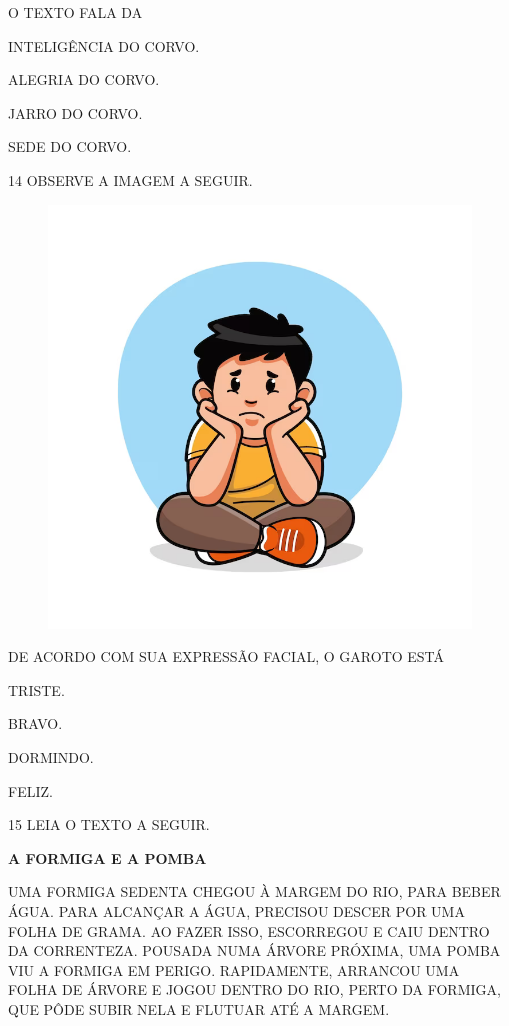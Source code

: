 O TEXTO FALA DA

\begin{escolha}

\item INTELIGÊNCIA DO CORVO.

\item ALEGRIA DO CORVO.

\item JARRO DO CORVO.

\item SEDE DO CORVO.

\end{escolha}

\num{14} OBSERVE A IMAGEM A SEGUIR.

\begin{figure}[H]
\centering
\includegraphics[width=.6\textwidth]{./media/image237.png}
\end{figure}

DE ACORDO COM SUA EXPRESSÃO FACIAL, O GAROTO ESTÁ

\begin{escolha}

\item TRISTE.

\item BRAVO.

\item DORMINDO.

\item FELIZ.

\end{escolha}

\num{15} LEIA O TEXTO A SEGUIR.

\begin{myquote}
\textbf{A FORMIGA E A POMBA}

UMA FORMIGA SEDENTA CHEGOU À MARGEM DO RIO, PARA BEBER
ÁGUA. PARA ALCANÇAR A ÁGUA, PRECISOU DESCER POR UMA FOLHA DE
GRAMA. AO FAZER ISSO, ESCORREGOU E CAIU DENTRO DA CORRENTEZA.
POUSADA NUMA ÁRVORE PRÓXIMA, UMA POMBA VIU A
FORMIGA EM PERIGO. RAPIDAMENTE, ARRANCOU UMA FOLHA DE
ÁRVORE E JOGOU DENTRO DO RIO, PERTO DA FORMIGA, QUE PÔDE SUBIR
NELA E FLUTUAR ATÉ A MARGEM.

\end{myquote}

